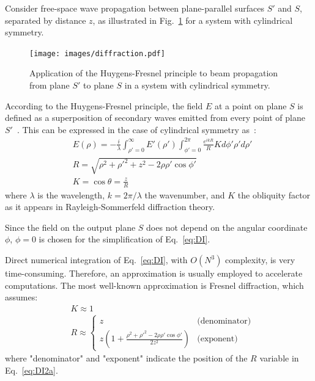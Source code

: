 \documentclass{report}
\begin{document}
Consider free-space wave propagation between plane-parallel surfaces \(S'\) and \(S\), separated by distance \(z\), as illustrated in Fig.~\ref{fig:diffraction} for a system with cylindrical symmetry.
\begin{figure}[ht] 
 \centering
 \texttt{[image: images/diffraction.pdf]}
 \caption{Application of the Huygens-Fresnel principle to beam propagation from plane \(S'\) to plane \(S\) in a system with cylindrical symmetry.}
 \label{fig:diffraction}
\end{figure}
According to the Huygens-Fresnel principle, the field \(E\) at a point on plane \(S\) is defined as a superposition of secondary waves emitted from every point of plane \(S'\)~\cite{BornWolf:1999}. This can be expressed in the case of cylindrical symmetry as~\cite{Siegman:1986,PeatrossWare:2015}:
\begin{subequations} \label{eq:DI}
 \begin{align}
  &E(\rho) = -\frac{i}{\lambda} \int_{\rho'=0}^{\infty} E'(\rho') \int_{\phi'=0}^{2\pi} \frac{e^{ikR}}{R} K d\phi' \rho' d\rho' \label{eq:DI2a}\\
  &R = \sqrt{\rho^2 + \rho'^2 + z^2 - 2\rho\rho'\cos\phi'} \label{eq:DI2b}\\
  &K = \cos\theta = \frac{z}{R} \label{eq:DI2c}
 \end{align}
\end{subequations}
where \(\lambda\) is the wavelength, \(k = 2\pi / \lambda\) the wavenumber, and \(K\) the obliquity factor as it appears in Rayleigh-Sommerfeld diffraction theory.

Since the field on the output plane \(S\) does not depend on the angular coordinate \(\phi\), \(\phi = 0\) is chosen for the simplification of Eq.~\ref{eq:DI}.

Direct numerical integration of Eq.~\ref{eq:DI}, with \(O(N^3)\) complexity, is very time-consuming. Therefore, an approximation is usually employed to accelerate computations. The most well-known approximation is Fresnel diffraction, which assumes:
\begin{equation} \label{eq:FreA}
 \begin{split}
  &K \approx 1\\
  &R \approx
  \begin{cases}
   z & \text{(denominator)}\\
   z \left(1 + \frac{\rho^2 + \rho'^2 - 2\rho\rho'\cos\phi'}{2z^2}\right) & \text{(exponent)}
  \end{cases}
 \end{split}
\end{equation}
where "denominator" and "exponent" indicate the position of the \(R\) variable in Eq.~\ref{eq:DI2a}.
\end{document}
